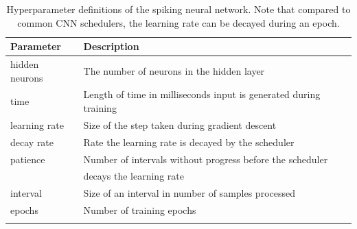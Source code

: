 \begin{longtable}[c]{@{}ll@{}}
\toprule
Parameter      & Description                                                               \\* \midrule
\endfirsthead
%
\endhead
%
\bottomrule
\endfoot
%
\endlastfoot
%
hidden neurons & The number of neurons in the hidden layer                                 \\
time           & Length of time in milliseconds input is generated during training \\
learning rate  & Size of the step taken during gradient descent                            \\
decay rate     & Rate the learning rate is decayed by the scheduler                        \\
patience       & Number of intervals without progress before the scheduler                 \\
               & decays the learning rate                                                  \\
interval       & Size of an interval in number of samples processed                        \\
epochs         & Number of training epochs                                                 \\* \bottomrule
\caption[Hyperparameter definitions of the spiking neural network]{Hyperparameter definitions of the spiking neural network. Note that compared to common CNN schedulers, the learning rate can be decayed during an epoch.}
\label{tab:bindsnet-hypers}
\end{longtable}\noindent
